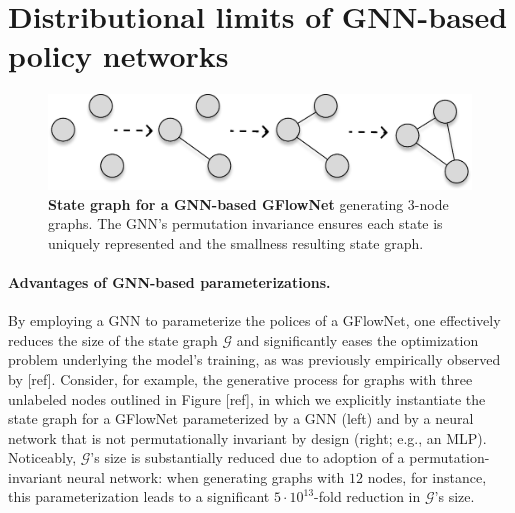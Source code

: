 \documentclass{article}
\theoremstyle{plain}
\theoremstyle{definition}
\theoremstyle{remark}
\theoremstyle{remark}
\begin{document}



\newpage 

\section{Distributional limits of GNN-based policy networks} \label{sec:rep}  

\begin{figure}[!t] 
    \centering
    \includegraphics[page=1, width=\linewidth]{graphsss.pdf}
    \caption{\textbf{State graph for a GNN-based GFlowNet} generating 3-node graphs. The GNN's permutation invariance ensures each state is uniquely represented and the smallness resulting state graph.}%
    \label{fig:gnns}
    \vspace{-12pt} 
\end{figure}

\paragraph{Advantages of GNN-based parameterizations.} By employing a GNN to parameterize the polices of a GFlowNet, one effectively reduces the size of the state graph $\mathcal{G}$ and significantly eases the optimization problem underlying the model's training, as was previously empirically observed by [ref]. Consider, for example, the generative process for graphs with three unlabeled nodes outlined in Figure [ref], in which we explicitly instantiate the state graph for a GFlowNet parameterized by a GNN (left) and by a neural network that is not permutationally invariant by design (right; e.g., an MLP). Noticeably, $\mathcal{G}$'s size is substantially reduced due to adoption of a permutation-invariant neural network: when generating graphs with $12$ nodes, for instance, this parameterization leads to a significant $5 \cdot 10^{13}$-fold reduction in $\mathcal{G}$'s size.  
\end{document}
